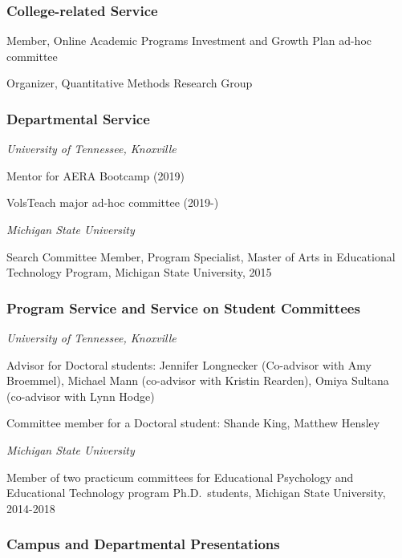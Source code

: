 \documentclass[
  14,
]{article}
\begin{document}
\hypertarget{college-related-service}{%
\subsubsection{College-related Service}\label{college-related-service}}

Member, Online Academic Programs Investment and Growth Plan ad-hoc
committee

Organizer, Quantitative Methods Research Group

\hypertarget{departmental-service}{%
\subsubsection{Departmental Service}\label{departmental-service}}

\emph{University of Tennessee, Knoxville}

Mentor for AERA Bootcamp (2019)

VolsTeach major ad-hoc committee (2019-)

\emph{Michigan State University}

Search Committee Member, Program Specialist, Master of Arts in
Educational Technology Program, Michigan State University, 2015

\hypertarget{program-service-and-service-on-student-committees}{%
\subsubsection{Program Service and Service on Student
Committees}\label{program-service-and-service-on-student-committees}}

\emph{University of Tennessee, Knoxville}

Advisor for Doctoral students: Jennifer Longnecker (Co-advisor with Amy
Broemmel), Michael Mann (co-advisor with Kristin Rearden), Omiya Sultana
(co-advisor with Lynn Hodge)

Committee member for a Doctoral student: Shande King, Matthew Hensley

\emph{Michigan State University}

Member of two practicum committees for Educational Psychology and
Educational Technology program Ph.D.~students, Michigan State
University, 2014-2018

\hypertarget{campus-and-departmental-presentations}{%
\subsubsection{Campus and Departmental
Presentations}\label{campus-and-departmental-presentations}}
\end{document}
